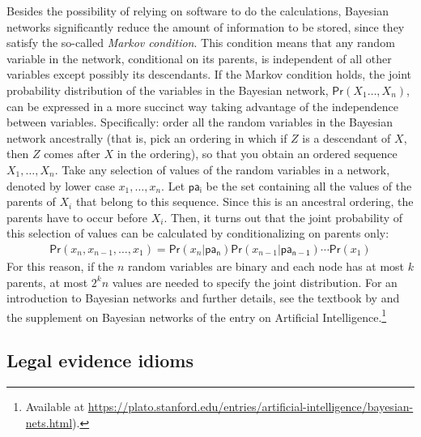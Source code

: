 \documentclass{article}
\newcommand{\pr}{\mathsf{Pr}}
\begin{document}
Besides the possibility of relying on software to do the calculations, Bayesian networks
 significantly reduce the amount of information to be stored,   since they satisfy the so-called \emph{Markov condition}. This condition means that any random variable in the network, conditional on its parents, is independent of all other variables except possibly its descendants.
If the Markov condition holds, the joint probability distribution of the variables in the Bayesian network, 
\(\pr(X_1\dots,X_n)\), can be expressed in a more succinct way taking advantage of the independence between variables.  
Specifically:  order all the random variables in the Bayesian network ancestrally (that is, pick an ordering in which if $Z$ is a descendant of $X$, then $Z$ comes after $X$ in the ordering), so that you obtain an ordered  sequence $X_1, \dots, X_n$. Take any selection of values of the random variables in a network, denoted by lower case $x_1, \dots, x_n$. Let $\mathsf{pa_i}$ be the set containing all the values of the parents of $X_i$ that belong to this sequence. Since this is an ancestral ordering, the parents have to occur before $X_i$. Then, it turns out that the joint probability of this selection of values can be calculated by conditionalizing on parents only:
\begin{align*}\pr(x_n, x_{n-1}, \dots, x_1) = \pr(x_n\vert \mathsf{pa_n})\pr(x_{n-1}\vert \mathsf{pa_{n-1}})\cdots \pr(x_1)\label{eq:markoproof1}\end{align*}
\noindent For this reason,  if the $n$ random variables are binary and each node has at most \(k\) parents, at most \(2^kn\) values are needed to specify the joint distribution. For an  introduction to Bayesian networks and further details, see the textbook by \cite{neapolitan2004learning} and the supplement on Bayesian networks of the entry on Artificial Intelligence.\footnote{Available at \url{https://plato.stanford.edu/entries/artificial-intelligence/bayesian-nets.html}).} %


\subsection{Legal evidence idioms} 
\end{document}
